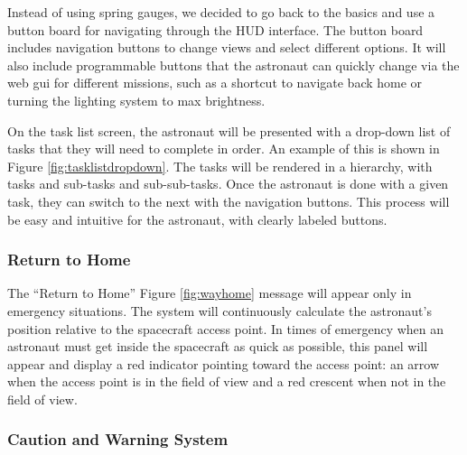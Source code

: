 \documentclass{article}
\let\Oldsubsubsection\subsubsection
\renewcommand{\subsubsection}{\FloatBarrier\Oldsubsubsection}
\begin{document}
Instead of using spring gauges, we decided to go back to the basics and use a button board for navigating through the HUD interface. The button board includes navigation buttons to change views and select different options. It will also include programmable buttons that the astronaut can quickly change via the web gui for different missions, such as a shortcut to navigate back home or turning the lighting system to max brightness.

On the task list screen, the astronaut will be presented with a drop-down list of tasks that they will need to complete in order. An example of this is shown in Figure \ref{fig:tasklistdropdown}. The tasks will be rendered in a hierarchy, with tasks and sub-tasks and sub-sub-tasks. Once the astronaut is done with a given task, they can switch to the next with the navigation buttons. This process will be easy and intuitive for the astronaut, with clearly labeled buttons.

\subsubsection{Return to Home}

The “Return to Home” Figure \ref{fig:wayhome} message will appear only in emergency situations. The system will continuously calculate the astronaut's position relative to the spacecraft access point. In times of emergency when an astronaut must get inside the spacecraft as quick as possible, this panel will appear and display a red indicator pointing toward the access point: an arrow when the access point is in the field of view and a red crescent when not in the field of view.

\subsubsection{Caution and Warning System}
\end{document}
